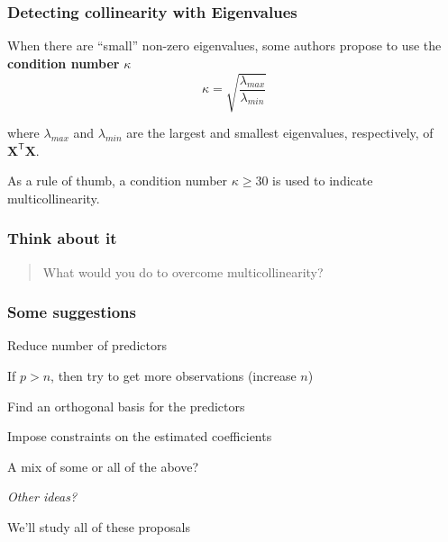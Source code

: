 \documentclass[12pt]{beamer}\usepackage[]{graphicx}\usepackage[]{color}
\begin{document}

\begin{frame}
\frametitle{Detecting collinearity with Eigenvalues}

When there are ``small'' non-zero eigenvalues, some authors propose to use the 
\textbf{condition number} $\kappa$
$$
\kappa = \sqrt{\frac{\lambda_{max}}{\lambda_{min}}}
$$

where $\lambda_{max}$ and $\lambda_{min}$ are the largest and smallest eigenvalues, 
respectively, of $\mathbf{X^\mathsf{T} X}$.

\bigskip
As a rule of thumb, a condition number $\kappa \geq 30$ is used to indicate multicollinearity.

\end{frame}


\begin{frame}
\frametitle{Think about it}

{\Large 
\begin{quotation}
\mdlit \noindent What would you do to overcome multicollinearity?
\end{quotation}
}

\end{frame}


\begin{frame}
\frametitle{Some suggestions}

\bbi
  \item Reduce number of predictors
  \item If $p > n$, then try to get more observations (increase $n$)
  \item Find an orthogonal basis for the predictors
  \item Impose constraints on the estimated coefficients
  \item A mix of some or all of the above?
  \item \textit{Other ideas?}
\ei

{\lolit We'll study all of these proposals}

\end{frame}

\end{document}
